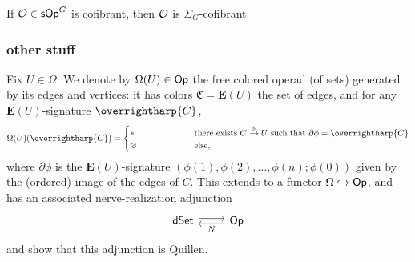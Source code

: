 \documentclass[a4paper,10pt
,draft
]{article}%
\renewcommand{\1}{\eta}%
\newcommand{\vect}[1]{\text{\overrightharp{\ensuremath{#1}}}}
\begin{document}
\begin{corollary}
      If $\mathcal{O} \in \mathsf{sOp}^G$ is cofibrant, then $\mathcal{O}$ is $\Sigma_G$-cofibrant.
\end{corollary}




















\subsubsection{other stuff}


\begin{definition}
      \label{OT_DEF}
      Fix $U \in \Omega$.
      We denote by $\Omega(U) \in \mathsf{Op}$ the free colored operad (of sets) generated by its edges and vertices:
      it has colors $\mathfrak C = \mathbf E(U)$ the set of edges, and
      for any $\mathbf E(U)$-signature $\vect C$, 
      \begin{equation}
            \Omega(U)(\vect C) =
            \begin{cases}
                  \** \qquad \qquad \qquad & \mbox{there exists $C \xrightarrow{\phi} U$ such that $\partial \phi = \vect C$}
                  \\
                  \varnothing & \text{else,}
            \end{cases}
      \end{equation}
      where $\partial \phi$ is the $\mathbf E(U)$-signature $(\phi(1), \phi(2), \dots, \phi(n); \phi(0))$
      given by the (ordered) image of the edges of $C$.
      This extends to a functor $\Omega \hookrightarrow \mathsf{Op}$, and has an associated nerve-realization adjunction
      \begin{equation}
            \label{dSETADJ_EQ}
            \begin{tikzcd}
                  \dSet \arrow[r, shift left]
                  &
                  \Op \arrow[l, shift left, "N"]
            \end{tikzcd}
      \end{equation}
      and \cite[Prop. 2.5]{CM11} show that this adjunction is Quillen.
\end{definition}
\end{document}
